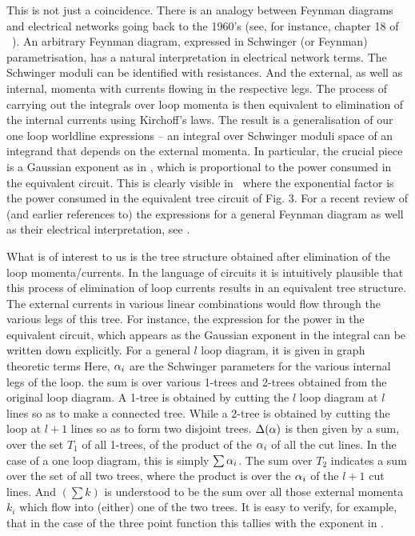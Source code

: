 This is not just a coincidence. There is an analogy between Feynman diagrams and 
electrical networks going back to the 1960's (see, for instance, chapter 18 of \BD\ ). 
An arbitrary Feynman diagram, 
expressed in Schwinger (or Feynman) parametrisation,  
has a natural interpretation in electrical network terms. The Schwinger moduli
can be identified with resistances. And the external, as well as 
internal, momenta with currents flowing in the respective legs. 
The process of carrying out the integrals over loop momenta is then equivalent to elimination
of the internal currents using Kirchoff's laws.
The result  is a generalisation 
of our one loop worldline expressions -- an integral over Schwinger moduli space of an integrand
that depends on the external momenta. In particular, the crucial piece is a 
Gaussian exponent as in \modint , which is proportional to the power 
consumed in the equivalent circuit. This is clearly 
visible in \thrept\ where the exponential factor is the power consumed in 
the equivalent tree circuit of Fig. 3. 
For a recent review of (and earlier references to) 
the expressions for a general Feynman diagram as well as their electrical interpretation, 
see \lam .   

What is of interest to us is the tree structure obtained after 
elimination of the loop momenta/currents. In the language of circuits it
is intuitively plausible that this process 
of elimination of loop currents results in an equivalent tree structure. The external
currents in various linear combinations would flow through the various legs of this tree.  
For instance, the expression for the power in the equivalent circuit, which appears as the 
Gaussian exponent in the integral can be written down explicitly. 
For a general $l$ loop diagram, it
is given in graph theoretic terms \lam 
\eqn{} 
Here, ${\alpha}_i$ are the Schwinger parameters for the various internal legs of the loop. 
the sum is over various 1-trees and 2-trees obtained from the original loop diagram. 
A 1-tree is obtained by cutting the $l$ loop diagram at $l$ lines so as to make a connected 
tree. While a 2-tree is obtained by cutting the loop at $l+1$ lines so as to form two 
disjoint trees. ${\Delta}({\alpha})$ is then given by a sum, over the set $T_1$ of all 1-trees, of the product
of the ${\alpha}_i$ of all the cut lines. In the case of a one loop diagram, this is simply $\sum {\alpha}_i$.
The sum over $T_2$ indicates a sum over the set of 
all two trees, where the product is over the ${\alpha}_i$ of the 
$l+1$ cut lines. And $(\sum k)$ is understood to be the sum over all those external momenta $k_i$ 
which flow into (either) one of the two trees. It is easy to verify, for example, that in the case of the 
three point function this tallies with the exponent in \thrept . 

